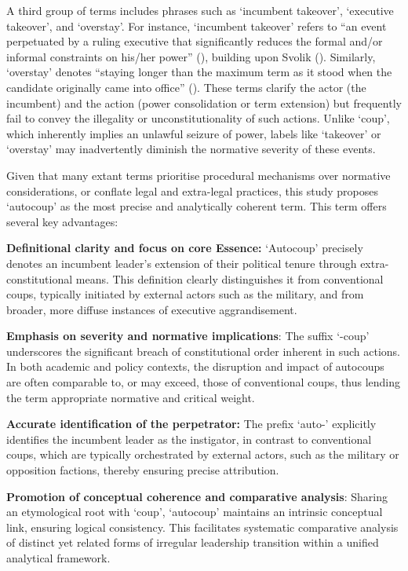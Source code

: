 \documentclass[
  12pt,
]{report}
\begin{document}
A third group of terms includes phrases such as `incumbent takeover',
`executive takeover', and `overstay'. For instance, `incumbent takeover'
refers to ``an event perpetuated by a ruling executive that
significantly reduces the formal and/or informal constraints on his/her
power'' (),
building upon Svolik (). Similarly,
`overstay' denotes ``staying longer than the maximum term as it stood
when the candidate originally came into office''
(). These terms clarify the actor (the incumbent) and the action
(power consolidation or term extension) but frequently fail to convey
the illegality or unconstitutionality of such actions. Unlike `coup',
which inherently implies an unlawful seizure of power, labels like
`takeover' or `overstay' may inadvertently diminish the normative
severity of these events.

Given that many extant terms prioritise procedural mechanisms over
normative considerations, or conflate legal and extra-legal practices,
this study proposes `autocoup' as the most precise and analytically
coherent term. This term offers several key advantages:

\textbf{Definitional clarity and focus on core Essence:} `Autocoup'
precisely denotes an incumbent leader's extension of their political
tenure through extra-constitutional means. This definition clearly
distinguishes it from conventional coups, typically initiated by
external actors such as the military, and from broader, more diffuse
instances of executive aggrandisement.

\textbf{Emphasis on severity and normative implications}: The suffix
`-coup' underscores the significant breach of constitutional order
inherent in such actions. In both academic and policy contexts, the
disruption and impact of autocoups are often comparable to, or may
exceed, those of conventional coups, thus lending the term appropriate
normative and critical weight.

\textbf{Accurate identification of the perpetrator:} The prefix `auto-'
explicitly identifies the incumbent leader as the instigator, in
contrast to conventional coups, which are typically orchestrated by
external actors, such as the military or opposition factions, thereby
ensuring precise attribution.

\textbf{Promotion of conceptual coherence and comparative analysis}:
Sharing an etymological root with `coup', `autocoup' maintains an
intrinsic conceptual link, ensuring logical consistency. This
facilitates systematic comparative analysis of distinct yet related
forms of irregular leadership transition within a unified analytical
framework.
\end{document}
